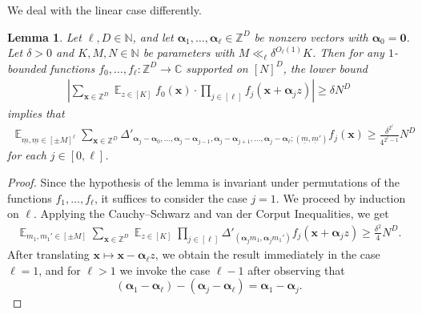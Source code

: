 \documentclass[11pt]{amsart}
\newtheorem{lemma}{Lemma}[section]
\theoremstyle{definition}
\DeclareMathOperator*{\E}{\mathbb{E}}
\newcommand{\C}{{\mathbb C}}
\newcommand{\N}{{\mathbb N}}
\newcommand{\Z}{{\mathbb Z}}
\newcommand{\bx}{{\textbf{x}}}
\newcommand{\balpha}{{\boldsymbol{\alpha}}}
\newcommand{\um}{{\underline{m}}}
\newcommand{\abs}[1]{\mathopen{}\left| #1\mathclose{}\right|}
\begin{document}
    We deal with the linear case differently. 
    \begin{lemma}\label{L: linear averages}
    Let $\ell, D\in\N$, and let $\balpha_{1}, \ldots, \balpha_\ell\in\Z^D$ be nonzero vectors with $\balpha_0 = \mathbf{0}$. Let $\delta>0$ and $K, M, N\in\N$ be parameters with $M\ll_\ell \delta^{O_\ell(1)} K$.  Then for any $1$-bounded functions $f_0, \ldots, f_\ell:\Z^D\to\C$ supported on $[N]^D$, the lower bound
    \begin{align*}
        \abs{\sum_{\bx\in\Z^D}\E_{z\in[K]}f_0(\bx)\cdot \prod_{j\in[\ell]}f_j(\bx+\balpha_j z)}\geq \delta N^D
    \end{align*}
    implies that
    \begin{align*}
        \E_{\um,\um\in[\pm M]^\ell}\sum_{\bx\in\Z^D} \Delta'_{\balpha_j - \balpha_0, \ldots,  \balpha_j - \balpha_{j-1}, \balpha_j - \balpha_{j+1}, \ldots, \balpha_j - \balpha_{\ell}; (\um,\um')} f_j(\bx) \geq \frac{\delta^{2^\ell}}{4^{2^\ell - 1}} N^D
    \end{align*}
    for each $j\in[0,\ell]$.
\end{lemma}
\begin{proof}
Since the hypothesis of the lemma is invariant under permutations of the functions $f_1, \ldots, f_\ell$, it suffices to consider the case $j=1$. We proceed by induction on $\ell$. Applying the Cauchy--Schwarz and van der Corput Inequalities, we get
    \begin{align*}
        \E_{m_1, m_1'\in[\pm M]}\sum_{\bx\in\Z^D}\E_{z\in[K]}\prod_{j\in[\ell]}\Delta'_{(\balpha_j m_1, \balpha_j m_1')}f_j(\bx+\balpha_j z) \geq \frac{\delta^2}{4}N^D.
    \end{align*}
    After translating $\bx\mapsto\bx-\balpha_\ell z$, we obtain the result immediately in the case $\ell = 1$, and for $\ell>1$ we invoke the case $\ell-1$ after observing that $$(\balpha_1 - \balpha_\ell) - (\balpha_j - \balpha_\ell) = \balpha_1 - \balpha_j.$$ \qedhere
\end{proof}
\end{document}
